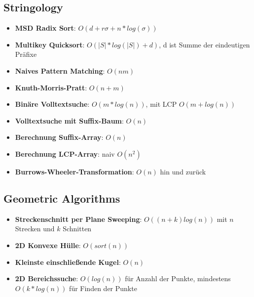 \documentclass[10pt,a4paper]{article}
\begin{document}
	\subsection{Stringology}
	\label{lz:sub:stringology}
	
	\begin{itemize}
		\item \textbf{MSD Radix Sort}: $O(d + r\sigma + n * log (\sigma))$
		\item \textbf{Multikey Quicksort}: $O(|S| * log(|S|) + d)$, d ist Summe der eindeutigen Präfixe
		\item \textbf{Naives Pattern Matching}: $O(nm)$
		\item \textbf{Knuth-Morris-Pratt}: $O(n + m)$
		\item \textbf{Binäre Volltextsuche}: $O(m * log (n))$, mit LCP $O(m + log (n))$
		\item \textbf{Volltextsuche mit Suffix-Baum}: $O(n)$
		\item \textbf{Berechnung Suffix-Array}: $O(n)$
		\item \textbf{Berechnung LCP-Array}: naiv $O(n^2)$
		\item \textbf{Burrows-Wheeler-Transformation}: $O(n)$ hin und zurück
	\end{itemize}

	\subsection{Geometric Algorithms}
	\label{lz:sub:geometric_algorithms}
	
	\begin{itemize}
		\item \textbf{Streckenschnitt per Plane Sweeping}: $O((n + k) log (n))$ mit $n$ Strecken und $k$ Schnitten
		\item \textbf{2D Konvexe Hülle}: $O(sort(n))$
		\item \textbf{Kleinste einschließende Kugel}: $O(n)$
		\item \textbf{2D Bereichssuche}: $O(log (n))$ für Anzahl der Punkte, mindestens $O(k * log (n))$ für Finden der Punkte
	\end{itemize}
\end{document}
